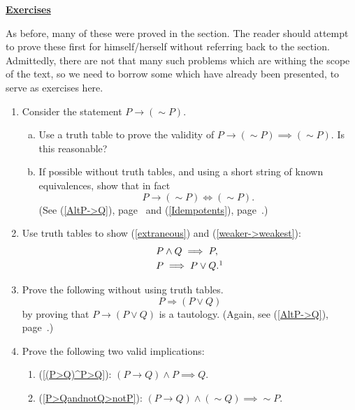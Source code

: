 \newpage 

\begin{center}\underline{\Large{\bf Exercises}}\end{center}
\bigskip

As before, many of these were proved in the section.  The reader
should attempt to prove these first for himself/herself without referring
back to the section.  Admittedly, there are not that many such
problems which are withing the scope of the text, so we need to
borrow some which have already been presented, to serve as
exercises here.


\begin{multicols}{2}
\begin{enumerate}

\item Consider the statement $P\longrightarrow(\sim P)$.
\begin{enumerate}[(a)]
\item Use a truth table to prove the validity of
$P\longrightarrow(\sim P)
        \implies(\sim P)$.  Is this reasonable?
\item If possible without truth tables, 
and using a short string of known equivalences,
show that in fact
$$P\longrightarrow (\sim P)\iff(\sim P).$$
(See (\ref{AltP->Q}), page~\pageref{AltP->Q} and
(\ref{Idempotents}), page~\pageref{Idempotents}.)
\end{enumerate}


\item Use truth tables to show (\ref{extraneous})
and (\ref{weaker->weakest}):
\begin{align*}
&P\wedge Q\implies P,\\
&P\implies P\vee Q.\footnotemark\end{align*}

\item Prove the following without using truth tables.
$$P\Longrightarrow(P\vee Q)$$
by proving that $P\longrightarrow(P\vee Q)$
is a tautology.  (Again, 
see (\ref{AltP->Q}), page~\pageref{AltP->Q}.)


\item Prove the following two valid implications:

\begin{enumerate}
\item(\ref{(P>Q)^P>Q}): $ (P\longrightarrow Q)\wedge P
              \implies Q$.
\item (\ref{P>QandnotQ>notP}): $(P\longrightarrow Q)\wedge (\sim Q)
               \implies\sim P$.
 \end{enumerate}




\end{enumerate}
\end{multicols}
